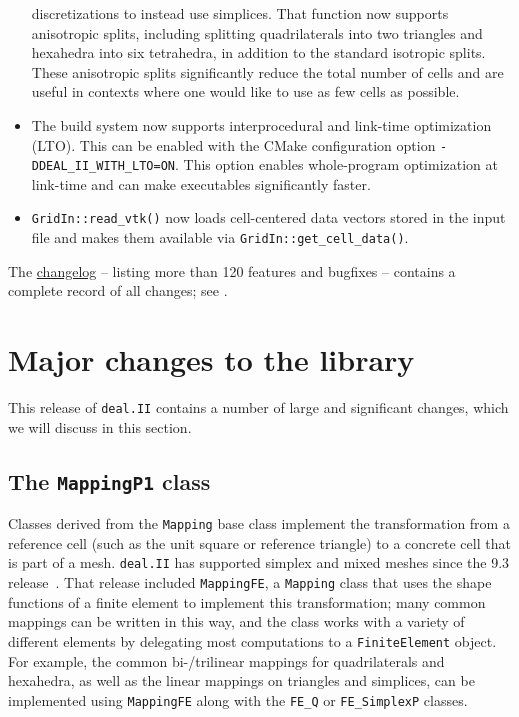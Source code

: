 \documentclass{ansarticle-preprint}
\newcommand{\specialword}[1]{\texttt{#1}}
\newcommand{\dealii}{{\specialword{deal.II}}\xspace}
\begin{document}
\begin{itemize}
  discretizations to instead use simplices. That function now supports
  anisotropic splits, including splitting quadrilaterals into two triangles and
  hexahedra into six tetrahedra, in addition to the standard isotropic splits.
  These anisotropic splits significantly reduce the total number of cells and
  are useful in contexts where one would like to use as few cells as
  possible.
\item The build system now supports interprocedural and link-time optimization
  (LTO). This can be enabled with the CMake configuration option
  \texttt{-DDEAL\_II\_WITH\_LTO=ON}. This option enables whole-program
  optimization at link-time and can make executables significantly faster.
\item \texttt{GridIn::read\_vtk()} now loads cell-centered data vectors stored
  in the input file and makes them available via
  \texttt{GridIn::get\_cell\_data()}.
\end{itemize}
%
The
\href{https://dealii.org/current/doxygen/deal.II/changes_between_9_6_0_and_9_7_0.html}{changelog}
-- listing more than 120
features and bugfixes --
contains a complete record of all changes; see \cite{changes97}.



\section{Major changes to the library}
\label{sec:major}

This release of \dealii contains a number of large and significant changes,
which we will discuss in this section.


\subsection{The \texttt{MappingP1} class}
\label{subsec:mappingp1}

Classes derived from the \texttt{Mapping} base class implement
the transformation from a reference cell (such as the unit
square or reference triangle) to a concrete cell that is part of a mesh.
\dealii has supported simplex and mixed meshes since the 9.3
release~\cite{dealii93}. That release included \texttt{MappingFE}, a
\texttt{Mapping} class that uses the shape functions of a finite
element to implement this transformation; many common mappings can be
written in this way, and the class works with a variety of different elements by
delegating most computations to a \texttt{FiniteElement}
object. For example, the common bi-/trilinear mappings for quadrilaterals and
hexahedra, as well as the linear mappings on triangles and simplices,
can be implemented using \texttt{MappingFE} along with the
\texttt{FE\_Q} or \texttt{FE\_SimplexP} classes.
\end{document}
